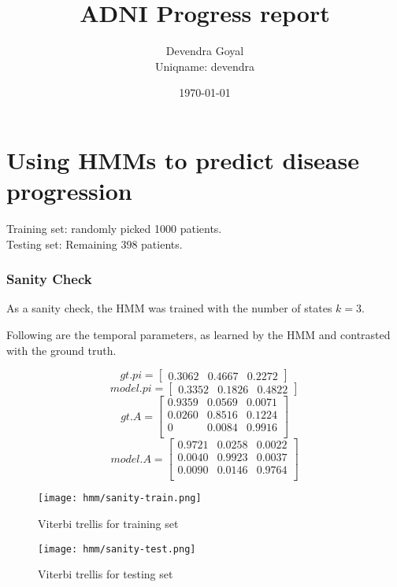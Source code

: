 \documentclass[12pt,a4paper]{article}
\title{ADNI Progress report}
\author{Devendra Goyal\\Uniqname: devendra}
\date{\today}
\begin{document}
\maketitle

\part{Using HMMs to predict disease progression}

Training set: randomly picked 1000 patients.\\
Testing set: Remaining 398 patients.

\section{Sanity Check}
\label{sec:sanity}

As a sanity check, the HMM was trained with the number of states
$k=3$.

Following are the temporal parameters, as learned by the HMM and
contrasted with the ground truth.

\[
gt.pi = \left[ 
\begin{array}{ccc} 
0.3062 & 0.4667 & 0.2272
\end{array}
 \right]
\]
\[
model.pi = \left[ 
\begin{array}{ccc} 
0.3352 & 0.1826 & 0.4822
\end{array}
 \right]
\]
\[
gt.A = \left[ 
\begin{array}{ccc} 
0.9359 & 0.0569 & 0.0071 \\
0.0260 & 0.8516 & 0.1224 \\
0 & 0.0084 & 0.9916 \\
\end{array}
 \right]
\]
\[
model.A = \left[ 
\begin{array}{ccc} 
0.9721 & 0.0258 & 0.0022 \\
0.0040 & 0.9923 & 0.0037 \\
0.0090 & 0.0146 & 0.9764 \\
\end{array}
 \right]
\]

\begin{figure}[H]
  \centering
  \texttt{[image: hmm/sanity-train.png]}
  \caption{Viterbi trellis for training set}  
\end{figure}

\begin{figure}[H]
  \texttt{[image: hmm/sanity-test.png]}
  \caption{Viterbi trellis for testing set}  
\end{figure}
\end{document}
